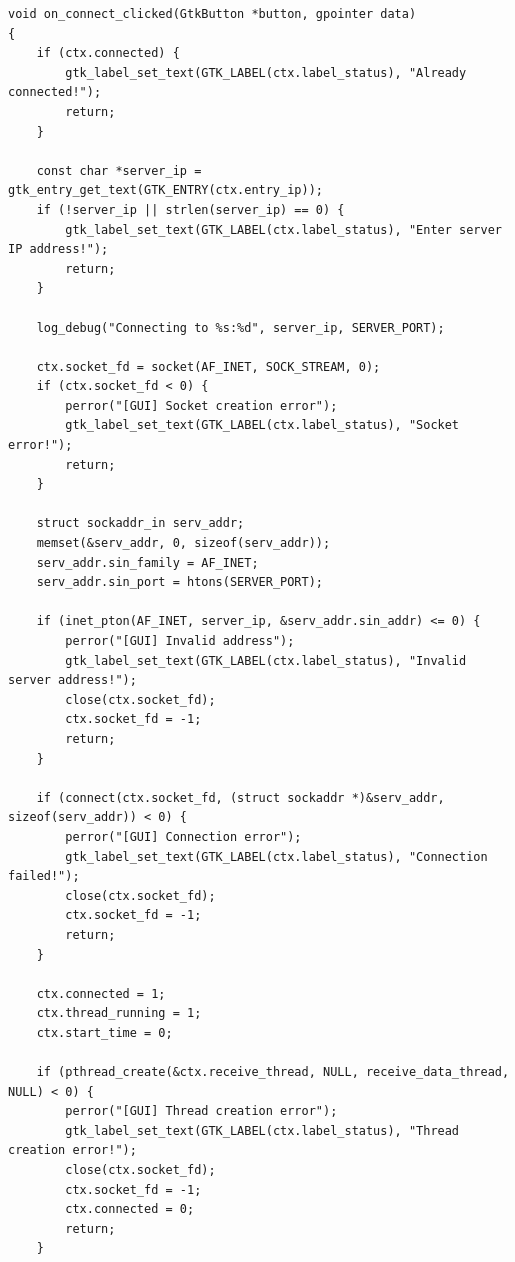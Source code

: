 \begin{verbatim}
void on_connect_clicked(GtkButton *button, gpointer data)
{
    if (ctx.connected) {
        gtk_label_set_text(GTK_LABEL(ctx.label_status), "Already connected!");
        return;
    }

    const char *server_ip = gtk_entry_get_text(GTK_ENTRY(ctx.entry_ip));
    if (!server_ip || strlen(server_ip) == 0) {
        gtk_label_set_text(GTK_LABEL(ctx.label_status), "Enter server IP address!");
        return;
    }

    log_debug("Connecting to %s:%d", server_ip, SERVER_PORT);

    ctx.socket_fd = socket(AF_INET, SOCK_STREAM, 0);
    if (ctx.socket_fd < 0) {
        perror("[GUI] Socket creation error");
        gtk_label_set_text(GTK_LABEL(ctx.label_status), "Socket error!");
        return;
    }

    struct sockaddr_in serv_addr;
    memset(&serv_addr, 0, sizeof(serv_addr));
    serv_addr.sin_family = AF_INET;
    serv_addr.sin_port = htons(SERVER_PORT);

    if (inet_pton(AF_INET, server_ip, &serv_addr.sin_addr) <= 0) {
        perror("[GUI] Invalid address");
        gtk_label_set_text(GTK_LABEL(ctx.label_status), "Invalid server address!");
        close(ctx.socket_fd);
        ctx.socket_fd = -1;
        return;
    }

    if (connect(ctx.socket_fd, (struct sockaddr *)&serv_addr, sizeof(serv_addr)) < 0) {
        perror("[GUI] Connection error");
        gtk_label_set_text(GTK_LABEL(ctx.label_status), "Connection failed!");
        close(ctx.socket_fd);
        ctx.socket_fd = -1;
        return;
    }

    ctx.connected = 1;
    ctx.thread_running = 1;
    ctx.start_time = 0;

    if (pthread_create(&ctx.receive_thread, NULL, receive_data_thread, NULL) < 0) {
        perror("[GUI] Thread creation error");
        gtk_label_set_text(GTK_LABEL(ctx.label_status), "Thread creation error!");
        close(ctx.socket_fd);
        ctx.socket_fd = -1;
        ctx.connected = 0;
        return;
    }


\end{verbatim}
